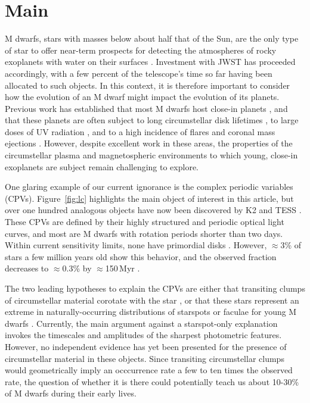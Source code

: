 \documentclass{nature3}
\begin{document}

\section{Main}
\label{sec:main}

M dwarfs, stars with masses below about half that of the Sun, are the
only type of star to offer near-term prospects for detecting the
atmospheres of rocky exoplanets with water on their surfaces
\cite{NAP26141}.  Investment with JWST has proceeded accordingly, with
a few percent of the telescope's time so far having been allocated to
such objects.  In this context, it is therefore important to consider
how the evolution of an M dwarf might impact the evolution of its
planets.  Previous work has established that most M dwarfs host
close-in planets \cite{Dressing2015}, and that these planets are often
subject to long circumstellar disk lifetimes \cite{Ribas2015}, to
large doses of UV radiation \cite{France2013}, and to a high incidence
of flares and coronal mass ejections \cite{Gunther2020}.  However,
despite excellent work in these areas, the properties of the
circumstellar plasma and magnetospheric environments to which young,
close-in exoplanets are subject remain challenging to explore. 

One glaring example of our current ignorance is the complex periodic
variables (CPVs).  Figure~\ref{fig:lc} highlights the main object of
interest in this article, but over one hundred analogous objects have
now been discovered by K2 and TESS 
\cite{Rebull2016,Stauffer2017,Rebull2018,Zhan2019,Rebull2020,Bouma2024}.
These CPVs are
defined by their highly structured and periodic optical light curves, 
and most are M dwarfs with rotation periods shorter than two days.
Within current sensitivity limits, none have primordial disks
\cite{Stauffer2017,Bouma2024}.
However, $\approx$3\% of stars a few million years old show this
behavior, and the observed fraction decreases to $\approx$0.3\%
by $\approx$150\,Myr \cite{Rebull2020}.

The two leading hypotheses to explain the CPVs are either that
transiting clumps of circumstellar material corotate with the star
\cite{Stauffer2017,Gunther2022,Bouma2024},
or that these stars represent an extreme in
naturally-occurring distributions of starspots or faculae for young M
dwarfs \cite{Koen2021}.  Currently, the main argument against a
starspot-only explanation invokes the timescales and amplitudes of the
sharpest photometric features.  However, no independent
evidence has yet been presented for the presence of circumstellar
material in these objects.  Since transiting circumstellar clumps
would geometrically imply an occcurrence rate a few to ten times the
observed rate, the question of whether it is there could potentially
teach us about 10-30\% of M dwarfs during their early lives.
\end{document}
